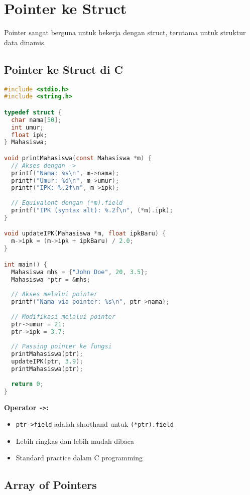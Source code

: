 \documentclass[../main.tex]{subfiles}
\begin{document}
\section{Pointer ke Struct}

Pointer sangat berguna untuk bekerja dengan struct, terutama untuk struktur data dinamis.

\subsection{Pointer ke Struct di C}

\begin{lstlisting}[language=C, caption={Pointer to struct di C}]
#include <stdio.h>
#include <string.h>

typedef struct {
  char nama[50];
  int umur;
  float ipk;
} Mahasiswa;

void printMahasiswa(const Mahasiswa *m) {
  // Akses dengan ->
  printf("Nama: %s\n", m->nama);
  printf("Umur: %d\n", m->umur);
  printf("IPK: %.2f\n", m->ipk);
  
  // Equivalent dengan (*m).field
  printf("IPK (syntax alt): %.2f\n", (*m).ipk);
}

void updateIPK(Mahasiswa *m, float ipkBaru) {
  m->ipk = (m->ipk + ipkBaru) / 2.0;
}

int main() {
  Mahasiswa mhs = {"John Doe", 20, 3.5};
  Mahasiswa *ptr = &mhs;
  
  // Akses melalui pointer
  printf("Nama via pointer: %s\n", ptr->nama);
  
  // Modifikasi melalui pointer
  ptr->umur = 21;
  ptr->ipk = 3.7;
  
  // Passing pointer ke fungsi
  printMahasiswa(ptr);
  updateIPK(ptr, 3.9);
  printMahasiswa(ptr);
  
  return 0;
}
\end{lstlisting}

\textbf{Operator \texttt{->}:}
\begin{itemize}
  \item \texttt{ptr->field} adalah shorthand untuk \texttt{(*ptr).field}
  \item Lebih ringkas dan lebih mudah dibaca
  \item Standard practice dalam C programming
\end{itemize}

\subsection{Array of Pointers}
\end{document}
